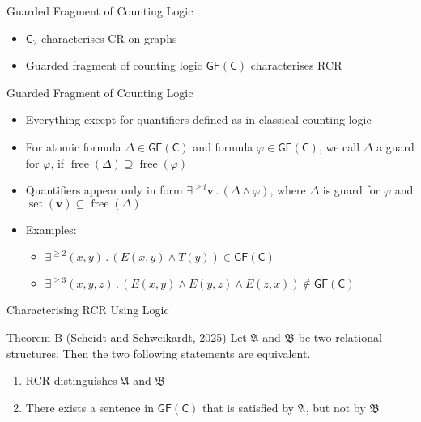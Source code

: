 \documentclass[aspectratio=169]{beamer}
\newcommand{\GFC}{\mathsf{GF}(\mathsf{C})}
\newcommand{\free}[1]{\operatorname{free}(#1)}
\newcommand{\set}{\operatorname{set}}
\newcommand{\C}[1]{\mathsf{C}_{#1}}
\renewcommand{\phi}{\varphi}
\begin{document}
	
	\begin{frame}{Guarded Fragment of Counting Logic}
		\begin{itemize}
			\item $\C{2}$ characterises CR on graphs
			\item Guarded fragment of counting logic $\GFC$ characterises RCR
		\end{itemize}
		
		\begin{block}{Guarded Fragment of Counting Logic}
			\begin{itemize}
				\item Everything except for quantifiers defined as in classical counting logic
				\item For atomic formula $\Delta\in\GFC$ and formula $\phi\in\GFC$, we call $\Delta$ a guard for $\phi$, if $\free{\Delta}\supseteq \free{\phi}$
				\item Quantifiers appear only in form $\exists^{\geq i} \mathbf v \operatorname{.} (\Delta \land \phi)$, where $\Delta$ is guard for $\phi$ and $\set(\mathbf v) \subseteq \free{\Delta}$
			\end{itemize}
		\end{block}
		\begin{itemize}
			\item Examples: 
			\begin{itemize}
				\item $\exists^{\geq 2} (x,y) \operatorname{.}(E(x,y)\land T(y))\in \GFC$
				\item $\exists^{\geq 3} (x,y,z) \operatorname{.} (E(x,y) \land E(y,z) \land E(z,x))\notin \GFC$
			\end{itemize}
		\end{itemize}
	\end{frame}
	
	\begin{frame}{Characterising RCR Using Logic}
		\begin{block}{Theorem B (Scheidt and Schweikardt, 2025)}
			Let $\mathfrak A$ and $\mathfrak B$ be two relational structures.
			Then the two following statements are equivalent.
			\begin{enumerate}
				\item RCR distinguishes $\mathfrak A$ and $\mathfrak B$
				\item There exists a sentence in $\GFC$ that is satisfied by $\mathfrak A$, but not by $\mathfrak B$
			\end{enumerate}
		\end{block}
	\end{frame}
	
\end{document}
